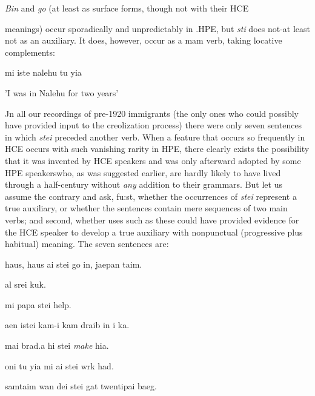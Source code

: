 \textit{Bin }and \textit{go }(at least as surface forms, though not with their HCE

meanings) occur sporadically and unpredictably in .HPE, but \textit{s}\textit{t}\textit{i} does not-at least not as an auxiliary. It does, however, occur as a mam verb, taking locative complements:

\ea\label{ex:44}
 mi iste nalehu tu yia
\glt
\z

'I was in Nalehu for two years'

Jn all our recordings of pre{}-1920 immigrants (the only ones who could possibly have provided input to the creolization process) there were only seven sentences in which \textit{stei} preceded another verb. When a feature that occurs so frequently in HCE occurs with such vanishing rarity in HPE, there clearly exists the possibility that it was invented by HCE speakers and was only afterward adopted by some HPE speakers\-who, as was suggested earlier, are hardly likely to have lived through a half-century without \textit{any} addition to their grammars. But let us assume the contrary and ask, fu:st, whether the occurrences of \textit{stei} represent
a true auxiliary, or whether the sentences contain mere sequences of two main verbs; and second, whether uses such as these could have provided evidence for the HCE speaker to develop a true auxiliary with nonpunctual (progressive plus habitual) meaning. The seven sentences are:

\ea\label{ex:45}
 haus, haus ai stei go in, jaepan taim.
\glt
\z

\ea\label{ex:46}
 al srei kuk.
\glt
\z

\ea\label{ex:47}
 mi papa stei help.
\glt
\z

\ea\label{ex:48}
 aen istei kam-i kam draib in i ka.
\glt
\z

\ea\label{ex:49}
 mai brad.a hi stei \textit{make} hia.
\glt
\z

\ea\label{ex:50}
 oni tu yia mi ai stei wrk had.
\glt
\z

\ea\label{ex:51}
 samtaim wan dei stei gat twentipai baeg.
\glt
\z

